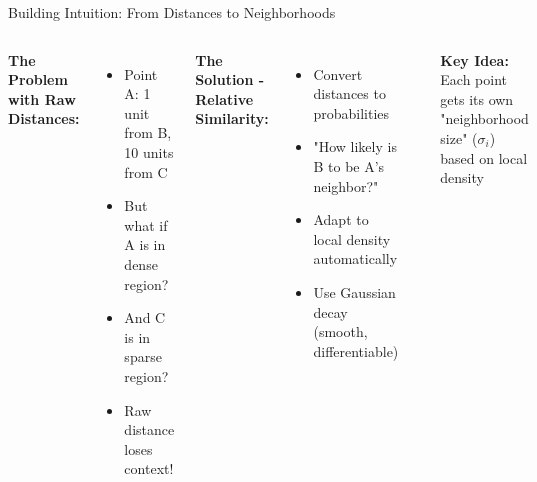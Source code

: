 \documentclass[aspectratio=169]{beamer}
\begin{document}
\begin{frame}{Building Intuition: From Distances to Neighborhoods}
\begin{columns}
\textbf{The Problem with Raw Distances:}
\begin{itemize}
\item Point A: 1 unit from B, 10 units from C
\item But what if A is in dense region?
\item And C is in sparse region?
\item Raw distance loses context!
\end{itemize}

\vspace{0.3cm}
\textbf{The Solution - Relative Similarity:}
\begin{itemize}
\item Convert distances to probabilities
\item "How likely is B to be A's neighbor?"
\item Adapt to local density automatically
\item Use Gaussian decay (smooth, differentiable)
\end{itemize}

\begin{center}
\end{center}

\vspace{0.2cm}
\textbf{Key Idea:} Each point gets its own "neighborhood size" ($\sigma_i$) based on local density
\end{columns}
\end{frame}
\end{document}
